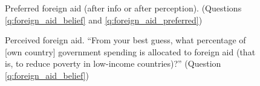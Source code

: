 \begin{figure} 
    \caption[Preferred foreign aid (summary)]{Preferred foreign aid (after info or after perception). (Questions \ref{q:foreign_aid_belief} and \ref{q:foreign_aid_preferred})}\label{fig:foreign_aid_no_less_all}
\end{figure} 


\begin{figure}[h!]
    \caption[Perceived foreign aid]{Perceived foreign aid. ``From your best guess, what percentage of [own country] government spending is allocated to foreign aid (that is, to reduce poverty in low-income countries)?'' (Question \ref{q:foreign_aid_belief})}\label{fig:foreign_aid_belief}
\end{figure}

